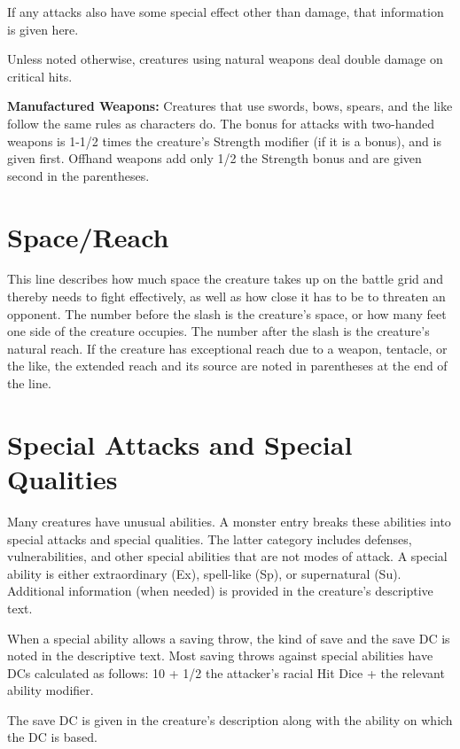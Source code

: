 \documentclass{article}
\begin{document}
If any attacks also have some special effect other than damage, that information 
is given here.

Unless noted otherwise, creatures using natural weapons deal double damage on critical 
hits.

\textbf{Manufactured Weapons:} Creatures that use swords, bows, spears, and the 
like follow the same rules as characters do. The bonus for attacks with two-handed 
weapons is 1-1/2 times the creature's Strength modifier (if it is a bonus), and 
is given first. Offhand weapons add only 1/2 the Strength bonus and are given second 
in the parentheses.

\section*{\textbf{Space/Reach}}

This line describes how much space the creature takes up on the battle grid and 
thereby needs to fight effectively, as well as how close it has to be to threaten 
an opponent. The number before the slash is the creature's space, or how many feet 
one side of the creature occupies. The number after the slash is the creature's 
natural reach. If the creature has exceptional reach due to a weapon, tentacle, 
or the like, the extended reach and its source are noted in parentheses at the 
end of the line.

\section*{\textbf{Special Attacks and Special Qualities}}

Many creatures have unusual abilities. A monster entry breaks these abilities into 
special attacks and special qualities. The latter category includes defenses, vulnerabilities, 
and other special abilities that are not modes of attack. A special ability is 
either extraordinary (Ex), spell-like (Sp), or supernatural (Su). Additional information 
(when needed) is provided in the creature's descriptive text.

When a special ability allows a saving throw, the kind of save and the save DC 
is noted in the descriptive text. Most saving throws against special abilities 
have DCs calculated as follows: 10 + 1/2 the attacker's racial Hit Dice + the relevant 
ability modifier.

The save DC is given in the creature's description along with the ability on which 
the DC is based.
\end{document}
